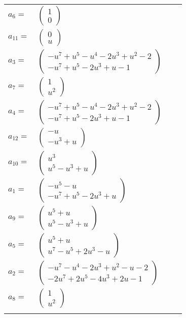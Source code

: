 \documentclass[1p]{elsarticle_modified}
\theoremstyle{definition}
\begin{document}
\begin{tabular}{m{7pt} m{180pt} m{7pt} m{180pt} }
\flushright $a_{6}=$&$\begin{pmatrix}1\\0\end{pmatrix}$ \\
\flushright $a_{11}=$&$\begin{pmatrix}0\\u\end{pmatrix}$ \\
\flushright $a_{3}=$&$\begin{pmatrix}- u^7+u^5- u^4-2 u^3+u^2-2\\- u^7+u^5-2 u^3+u-1\end{pmatrix}$ \\
\flushright $a_{7}=$&$\begin{pmatrix}1\\u^2\end{pmatrix}$ \\
\flushright $a_{4}=$&$\begin{pmatrix}- u^7+u^5- u^4-2 u^3+u^2-2\\- u^7+u^5-2 u^3+u-1\end{pmatrix}$ \\
\flushright $a_{12}=$&$\begin{pmatrix}- u\\- u^3+u\end{pmatrix}$ \\
\flushright $a_{10}=$&$\begin{pmatrix}u^3\\u^5- u^3+u\end{pmatrix}$ \\
\flushright $a_{1}=$&$\begin{pmatrix}- u^5- u\\- u^7+u^5-2 u^3+u\end{pmatrix}$ \\
\flushright $a_{9}=$&$\begin{pmatrix}u^5+u\\u^5- u^3+u\end{pmatrix}$ \\
\flushright $a_{5}=$&$\begin{pmatrix}u^5+u\\u^7- u^5+2 u^3- u\end{pmatrix}$ \\
\flushright $a_{2}=$&$\begin{pmatrix}- u^7- u^4-2 u^3+u^2- u-2\\-2 u^7+2 u^5-4 u^3+2 u-1\end{pmatrix}$ \\
\flushright $a_{8}=$&$\begin{pmatrix}1\\u^2\end{pmatrix}$\\&\end{tabular}
\end{document}
